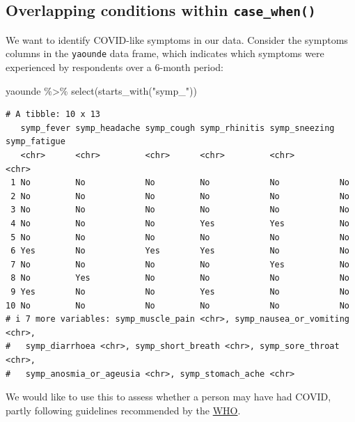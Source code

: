 \documentclass[
  letterpaper,
  DIV=11,
  numbers=noendperiod]{scrreprt}
\newenvironment{Shaded}{\begin{snugshade}}{\end{snugshade}}
\newcommand{\FunctionTok}[1]{\textcolor[rgb]{0.28,0.35,0.67}{#1}}
\newcommand{\NormalTok}[1]{\textcolor[rgb]{0.00,0.23,0.31}{#1}}
\newcommand{\SpecialCharTok}[1]{\textcolor[rgb]{0.37,0.37,0.37}{#1}}
\newcommand{\StringTok}[1]{\textcolor[rgb]{0.13,0.47,0.30}{#1}}
\begin{document}
\subsection{\texorpdfstring{Overlapping conditions within
\texttt{case\_when()}}{Overlapping conditions within case\_when()}}\label{overlapping-conditions-within-case_when}

We want to identify COVID-like symptoms in our data. Consider the
symptoms columns in the \texttt{yaounde} data frame, which indicates
which symptoms were experienced by respondents over a 6-month period:

\begin{Shaded}
\begin{Highlighting}[]
\NormalTok{yaounde }\SpecialCharTok{\%\textgreater{}\%} 
  \FunctionTok{select}\NormalTok{(}\FunctionTok{starts\_with}\NormalTok{(}\StringTok{"symp\_"}\NormalTok{))}
\end{Highlighting}
\end{Shaded}

\begin{verbatim}
# A tibble: 10 x 13
   symp_fever symp_headache symp_cough symp_rhinitis symp_sneezing symp_fatigue
   <chr>      <chr>         <chr>      <chr>         <chr>         <chr>       
 1 No         No            No         No            No            No          
 2 No         No            No         No            No            No          
 3 No         No            No         No            No            No          
 4 No         No            No         Yes           Yes           No          
 5 No         No            No         No            No            No          
 6 Yes        No            Yes        Yes           No            No          
 7 No         No            No         No            Yes           No          
 8 No         Yes           No         No            No            No          
 9 Yes        No            No         Yes           No            No          
10 No         No            No         No            No            No          
# i 7 more variables: symp_muscle_pain <chr>, symp_nausea_or_vomiting <chr>,
#   symp_diarrhoea <chr>, symp_short_breath <chr>, symp_sore_throat <chr>,
#   symp_anosmia_or_ageusia <chr>, symp_stomach_ache <chr>
\end{verbatim}

We would like to use this to assess whether a person may have had COVID,
partly following guidelines recommended by the
\href{https://apps.who.int/iris/handle/10665/333752}{WHO}.
\end{document}
